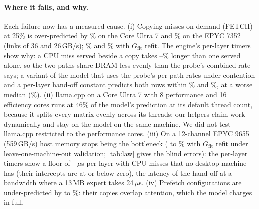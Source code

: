 \paragraph{Where it fails, and why.} Each failure now has a measured cause. (i) Copying misses on demand (FETCH) at
25\% is over-predicted by \lohoFrozenFetchUltra\% on the Core Ultra 7 and \lohoFrozenFetchEpyc\% on the EPYC 7352 (links
of 36 and 26\,GB/s); \lohoMaxFetchUltra\% and \lohoMaxFetchEpyc\% with $G_{\mathrm{fit}}$ refit. The engine's per-layer timers show
why: a CPU miss served beside a copy takes \fetchBesideMin--\fetchBesideMax\% longer than one served alone, so the two
paths share DRAM less evenly than the probe's combined rate says; a variant of the model that uses the probe's
per-path rates under contention and a per-layer hand-off constant predicts both rows within \lohoAsymFetchUltra\% and
\lohoAsymFetchEpyc\%, at a worse median (\lohoAsymMed\%). (ii) llama.cpp on a Core Ultra 7 with 8 performance and 16 efficiency cores runs at 46\% of the
model's prediction at its default thread count, because it splits every matrix evenly across its threads; our helpers claim work
dynamically and stay on the model on the same machine. We did not test llama.cpp restricted to the performance cores.
(iii) On a 12-channel EPYC 9655 (559\,GB/s) host memory stops being the bottleneck (\lohoMaxEpycMin{} to
\lohoMaxEpycMax\% with $G_{\mathrm{fit}}$ refit under leave-one-machine-out validation; \cref{tab:law} gives the blind errors): the per-layer timers show a floor of \epycFloorMin--\epycFloorMax\,$\mu$s per layer with CPU misses
that no desktop machine has (their intercepts are at or below zero), the latency of the hand-off at a bandwidth where a
13\,MB expert takes 24\,$\mu$s. (iv) Prefetch configurations are under-predicted by \lohoMaxPfMin{} to
\lohoMaxPfMax\%: their copies overlap attention, which the model charges in full.

